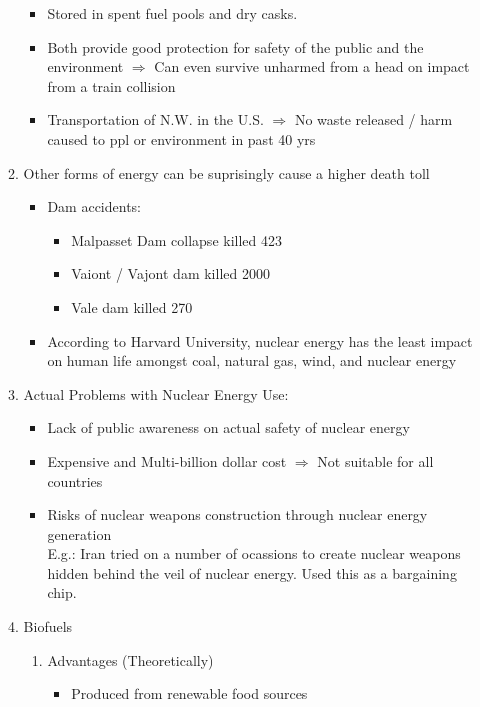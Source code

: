 \documentclass[oneside]{book}
\begin{document}
\begin{enumerate}
\begin{enumerate}
\begin{itemize}
            \item Stored in spent fuel pools and dry casks.
            \item Both provide good protection for safety of the public and the environment \( \Rightarrow \) Can even survive unharmed from a head on impact from a train collision
            \item Transportation of N.W. in the U.S. \( \Rightarrow \) No waste released / harm caused to ppl or environment in past 40 yrs
        \end{itemize}
        \item Other forms of energy can be suprisingly cause a higher death toll \begin{itemize}
            \item Dam accidents: \begin{itemize}
                \item Malpasset Dam collapse killed 423
                \item Vaiont / Vajont dam killed 2000 
                \item Vale dam killed 270
            \end{itemize}
            \item According to Harvard University, nuclear energy has the least impact on human life amongst coal, natural gas, wind, and nuclear energy
        \end{itemize}
        \item Actual Problems with Nuclear Energy Use: \begin{itemize}
            \item Lack of public awareness on actual safety of nuclear energy
            \item Expensive and Multi-billion dollar cost \( \Rightarrow \) Not suitable for all countries
            \item Risks of nuclear weapons construction through nuclear energy generation\\
            E.g.: Iran tried on a number of ocassions to create nuclear weapons hidden behind the veil of nuclear energy. Used this as a bargaining chip.
        \end{itemize}
        \item Biofuels
        \begin{enumerate}
            \item Advantages (Theoretically) \begin{itemize}
                \item Produced from renewable food sources 

\end{itemize}
\end{enumerate}
\end{enumerate}
\end{enumerate}
\end{document}
